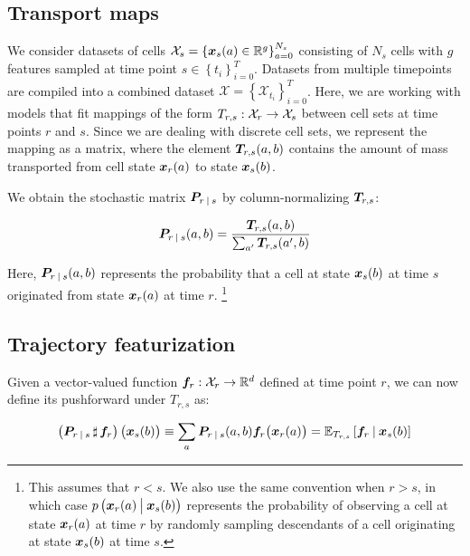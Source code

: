 
\subsection{Transport maps}

We consider datasets of cells $\mathcal{X}_s = \left\{\vect{x}\timepoint{s}(a) \in \mathbb{R}^{g}\right\}_{a=0}^{N_{s}}$ consisting of $N_s$ cells with $g$ features sampled at time point $s \in \left\{t_i\right\}_{i=0}^{T}$. Datasets from multiple timepoints are compiled into a combined dataset $\mathcal{X} = \left\{\mathcal{X}_{t_i}\right\}_{i=0}^{T}$. Here, we are working with models that fit mappings of the form $T\timepoint{r, s}: \mathcal{X}\timepoint{r} \rightarrow \mathcal{X}\timepoint{s}$ between cell sets at time points $r$ and $s$. Since we are dealing with discrete cell sets, we represent the mapping as a matrix, where the element $\matr{T}_{r, s}(a, b)$ contains the amount of mass transported from cell state $\vect{x}\timepoint{r}(a)$ to state $\vect{x}\timepoint{s}(b)$.

We obtain the stochastic matrix $\matr{P}\timepoint{r \given s}$ by column-normalizing $\matr{T}\timepoint{r, s}$:

\begin{equation}
    \matr{P}_{r \given s}(a, b) = \frac{\matr{T}_{r, s}(a, b)}{\sum_{a'} \matr{T}_{r, s}(a', b)}   
\end{equation}

Here, $\matr{P}\timepoint{r \given s}(a, b)$ represents the probability that a cell at state $\vect{x}\timepoint{s}(b)$ at time $s$ originated from state $\vect{x}\timepoint{r}(a)$ at time $r$. \footnote{This assumes that $r < s$. We also use the same convention when $r > s$, in which case $p\left(\vect{x}\timepoint{r}(a) \given[\big] \vect{x}\timepoint{s}(b)\right)$ represents the probability of observing a cell at state $\vect{x}\timepoint{r}(a)$ at time $r$ by randomly sampling descendants of a cell originating at state $\vect{x}\timepoint{s}(b)$ at time $s$.}

\subsection{Trajectory featurization}

Given a vector-valued function $\vect{f}\timepoint{r}: \mathcal{X}\timepoint{r} \rightarrow \mathbb{R}^d$ defined at time point $r$, we can now define its pushforward under $T_{r, s}$ as: 

\begin{align} \label{eq:pushforward}
    \left(\matr{P}\timepoint{r \given s} \pushforward \vect{f}\timepoint{r}\right)\bigl(\vect{x}\timepoint{s}(b)\bigr) \equiv \sum_{a} \matr{P}\timepoint{r \given s}(a, b) \vect{f}\timepoint{r}\bigl(\vect{x}\timepoint{r}(a)\bigr) = \mathbb{E}_{T\timepoint{r, s}}\left[\vect{f}\timepoint{r} \given \vect{x}\timepoint{s}(b)\right]
\end{align}

